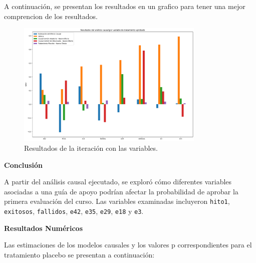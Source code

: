 A continuación, se presentan los resultados en un grafico para tener una mejor comprencion de los resultados.

\begin{figure}[H]
    \centering
    \includegraphics[width=0.8\textwidth]{img/causalidad/grafico_resultados_variables_full.png}
    \caption{Resultados de la iteración con las variables.}
    \label{fig:grafico_iteracion_variables_full_dowhy}
\end{figure}

\textbf{Conclusión}

A partir del análisis causal ejecutado, se exploró cómo diferentes variables asociadas a una guía de apoyo podrían afectar la probabilidad de aprobar la primera evaluación del curso. Las variables examinadas incluyeron \texttt{hito1}, \texttt{exitosos}, \texttt{fallidos}, \texttt{e42}, \texttt{e35}, \texttt{e29}, \texttt{e18} y \texttt{e3}.

\vspace{1em}  %

\textbf{Resultados Numéricos}

Las estimaciones de los modelos causales y los valores p correspondientes para el tratamiento placebo se presentan a continuación:


